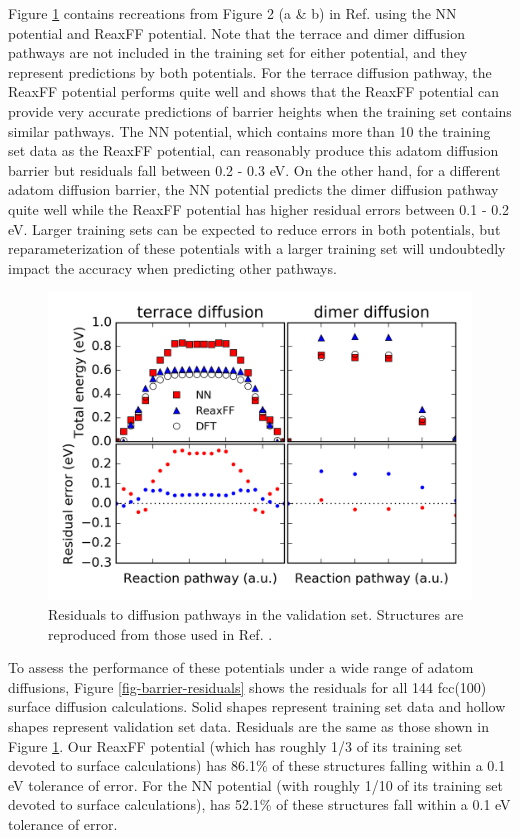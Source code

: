 \documentclass[12pt,oneside]{cmuthesis}
\begin{document}
Figure \ref{fig-full-diffusion} contains recreations from Figure 2 (a \& b) in Ref.  using the NN potential and ReaxFF potential. Note that the terrace and dimer diffusion pathways are not included in the training set for either potential, and they represent predictions by both potentials. For the terrace diffusion pathway, the ReaxFF potential performs quite well and shows that the ReaxFF potential can provide very accurate predictions of barrier heights when the training set contains similar pathways. The NN potential, which contains more than 10\texttimes{} the training set data as the ReaxFF potential, can reasonably produce this adatom diffusion barrier but residuals fall between 0.2 - 0.3 eV. On the other hand, for a different adatom diffusion barrier, the NN potential predicts the dimer diffusion pathway quite well while the ReaxFF potential has higher residual errors between 0.1 - 0.2 eV. Larger training sets can be expected to reduce errors in both potentials, but reparameterization of these potentials with a larger training set will undoubtedly impact the accuracy when predicting other pathways.

\begin{figure}[h]
\centering
\includegraphics[width=5.5in]{./images/fig-full-diffusion.png}
\caption{\label{fig-full-diffusion}
Residuals to diffusion pathways in the validation set. Structures are reproduced from those used in Ref. .}
\end{figure}

To assess the performance of these potentials under a wide range of adatom diffusions, Figure \ref{fig-barrier-residuals} shows the residuals for all 144 fcc(100) surface diffusion calculations. Solid shapes represent training set data and hollow shapes represent validation set data. Residuals are the same as those shown in Figure \ref{fig-full-diffusion}. Our ReaxFF potential (which has roughly 1/3 of its training set devoted to surface calculations) has 86.1\% of these structures falling within a \textpm{} 0.1 eV tolerance of error. For the NN potential (with roughly 1/10 of its training set devoted to surface calculations), has 52.1\% of these structures fall within a \textpm{} 0.1 eV tolerance of error.
\end{document}
